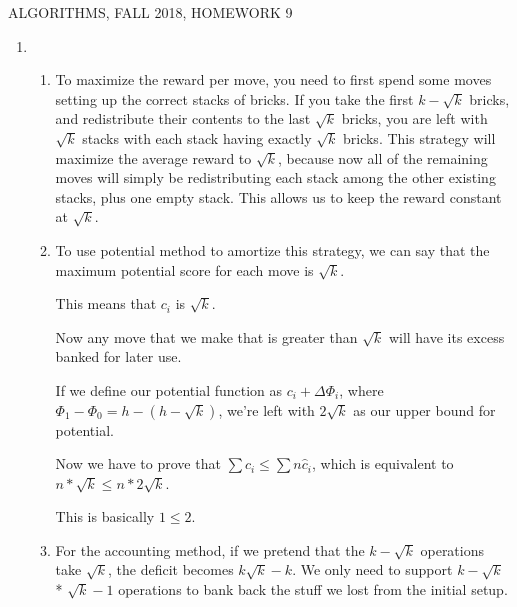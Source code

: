 \documentclass[12pt]{article}
\begin{document}
  
\pagestyle{empty}
 

\begin{center} ALGORITHMS,   FALL 2018, HOMEWORK 9
\end{center}

\begin{enumerate}

 \item 
    \begin{enumerate}
        \item

        To maximize the reward per move, you need to first spend some moves setting up the correct stacks of bricks. If you take the first $k - \sqrt{k}$ bricks, 
        and redistribute their contents to the last $\sqrt{k}$ bricks, you are left with $\sqrt{k}$ stacks with each stack having exactly $\sqrt{k}$ bricks.
        This strategy will maximize the average reward to $\sqrt{k}$, because now all of the remaining moves will simply be redistributing each stack among the 
        other existing stacks, plus one empty stack. This allows us to keep the reward constant at $\sqrt{k}$.

        \item

        To use potential method to amortize this strategy, we can say that the maximum potential score for each move is $\sqrt{k}$.

        This means that $c_i$ is $\sqrt{k}$.
        
        Now any move that we make that is greater than $\sqrt{k}$ will have its excess banked for later use.

        If we define our potential function as $c_i + \Delta\Phi_i$, where $\Phi_1 - \Phi_0 = h - (h - \sqrt{k})$, we're left with $2\sqrt{k}$ as our
        upper bound for potential.

        Now we have to prove that $\sum c_i \leq \sum n\hat{c}_i$, which is equivalent to $n * \sqrt{k} \leq n * 2 \sqrt{k}$.

        This is basically $1 \leq 2$.

\pagebreak

        \item

        For the accounting method, if we pretend that the $k - \sqrt{k}$ operations take $\sqrt{k}$, the deficit becomes $k\sqrt{k} - k$.
        We only need to support $k-\sqrt{k}$ * $\sqrt{k} - 1$ operations to bank back the stuff we lost from the initial setup.


\end{enumerate}
\end{enumerate}
\end{document}
